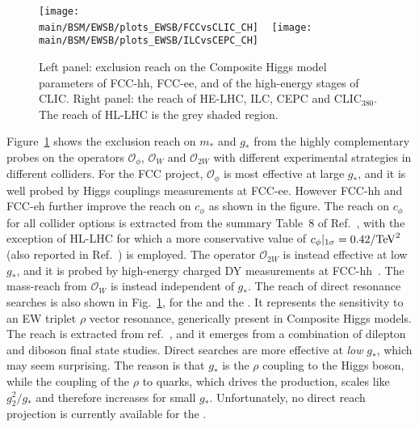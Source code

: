 \documentclass[../report.tex]{subfiles}
\providecommand{\main}{..}
\begin{document}
\begin{figure}[t]
    \centering
    \texttt{[image: \\main/BSM/EWSB/plots\_EWSB/FCCvsCLIC\_CH]} ~
        \texttt{[image: \\main/BSM/EWSB/plots\_EWSB/ILCvsCEPC\_CH]}
    \caption{Left panel: exclusion reach on the Composite Higgs model parameters of FCC-hh, FCC-ee, and of the high-energy stages of CLIC. Right panel: the reach of HE-LHC, ILC, CEPC and CLIC$_{380}$. The reach of HL-LHC is the grey shaded region.}
    \label{fig:Composite_Higgs}
\end{figure}

Figure~\ref{fig:Composite_Higgs} shows the exclusion reach on $m_*$ and $g_*$ from the highly complementary probes on the operators $\mathcal{O}_{\phi}$, $\mathcal{O}_{W}$ and $\mathcal{O}_{2W}$ with different experimental strategies in different colliders. For the FCC project, $\mathcal{O}_{\phi}$ is most effective at large $g_*$, and it is well probed by Higgs couplings measurements at FCC-ee. However FCC-hh and FCC-eh further improve the reach on $c_\phi$ as shown in the figure. The reach on $c_\phi$ for all collider options is extracted from the summary Table~8 of Ref.~\cite{deBlas:2019rxi}, with the exception of HL-LHC for which a more conservative value of $c_\phi|_{1\sigma}=0.42/{\rm{TeV}}^2$ (also reported in Ref.~\cite{deBlas:2019rxi}) is employed. The operator $\mathcal{O}_{2W}$ is instead effective at low $g_*$, and it is probed by high-energy charged DY measurements at FCC-hh~\cite{Farina:2016rws}. The mass-reach from $\mathcal{O}_{W}$ is instead independent of $g_*$.  The reach of direct resonance searches is also shown in Fig.~\ref{fig:Composite_Higgs}, for the \FCChh and the \HLLHC. It represents the sensitivity to an EW triplet $\rho$ vector resonance, generically present in Composite Higgs models. The reach is extracted from ref.~\cite{Thamm:2015zwa,Golling:2016gvc,Mangano:2651294}, and it emerges from a combination of dilepton and diboson final state studies. Direct searches are more effective at \emph{low} $g_*$, which may seem surprising. The reason is that $g_*$ is the $\rho$ coupling to the Higgs boson, while the coupling of the $\rho$ to quarks, which drives the production, scales like $g_2^2/g_*$ and therefore increases for small $g_*$. Unfortunately, no direct reach projection is currently available for the \HELHC.
\end{document}
